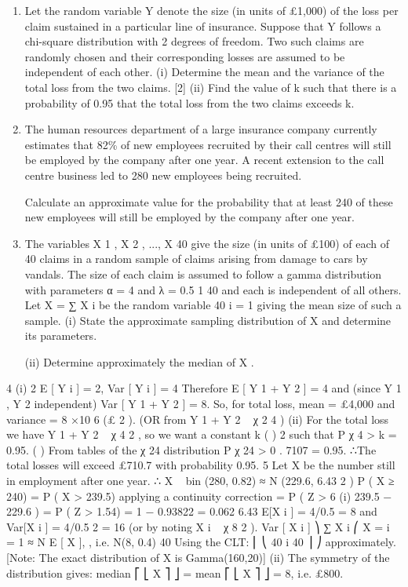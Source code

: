 \documentclass[a4paper,12pt]{article}
\begin{document}
\begin{enumerate}
\item 
Let the random variable Y denote the size (in units of £1,000) of the loss per claim sustained in a particular line of insurance. Suppose that Y follows a chi-square distribution with 2 degrees of freedom. Two such claims are randomly chosen and
their corresponding losses are assumed to be independent of each other.
(i) Determine the mean and the variance of the total loss from the two claims. [2]
(ii) Find the value of k such that there is a probability of 0.95 that the total loss from the two claims exceeds k.
\item 
The human resources department of a large insurance company currently estimates that 82\% of new employees recruited by their call centres will still be employed by the company after one year. A recent extension to the call centre business led to 280
new employees being recruited.

Calculate an approximate value for the probability that at least 240 of these new
employees will still be employed by the company after one year.
\item The variables X 1 , X 2 , ..., X 40 give the size (in units of £100) of each of 40 claims in a random sample of claims arising from damage to cars by vandals. The size of each claim is assumed to follow a gamma distribution with parameters α = 4 and λ = 0.5
1 40
and each is independent of all others. Let X =
∑ X i be the random variable
40 i = 1
giving the mean size of such a sample.
(i) State the approximate sampling distribution of X and determine its parameters.

(ii) Determine approximately the median of X .

\end{enumerate}

4
(i)
2
E [ Y i ] = 2, Var [ Y i ] = 4
Therefore E [ Y 1 + Y 2 ] = 4 and (since Y 1 , Y 2 independent) Var [ Y 1 + Y 2 ] = 8.
So, for total loss, mean = £4,000 and variance = 8 ×10 6 (£ 2 ).
(OR from Y 1 + Y 2 ~ χ 2 4 )
(ii)
For the total loss we have Y 1 + Y 2 ~ χ 4 2 , so we want a constant k
(
)
2
such that P χ 4 > k = 0.95.
(
)
From tables of the χ 24 distribution P χ 24 > 0 . 7107 = 0.95.
∴The total losses will exceed £710.7 with probability 0.95.
5
Let X be the number still in employment after one year.
∴ X ~ bin (280, 0.82) ≈ N (229.6, 6.43 2 )
P ( X ≥ 240) = P ( X > 239.5) applying a continuity correction
= P ( Z >
6
(i)
239.5 − 229.6
) = P ( Z > 1.54) = 1 − 0.93822 = 0.062
6.43
E[X i ] = 4/0.5 = 8 and Var[X i ] = 4/0.5 2 = 16 (or by noting X i ~ χ 8 2 ).
Var [ X i ] ⎞
∑ X i ⎛
X = i = 1 ≈ N E [ X ],
, i.e. N(8, 0.4)
40
Using the CLT:
⎜
⎝
40
i
40
⎟
⎠
approximately.
[Note: The exact distribution of X is Gamma(160,20)]
(ii)
The symmetry of the distribution gives: median ⎡ ⎣ X ⎤ ⎦ = mean ⎡ ⎣ X ⎤ ⎦ = 8,
i.e. £800.
\end{document}

